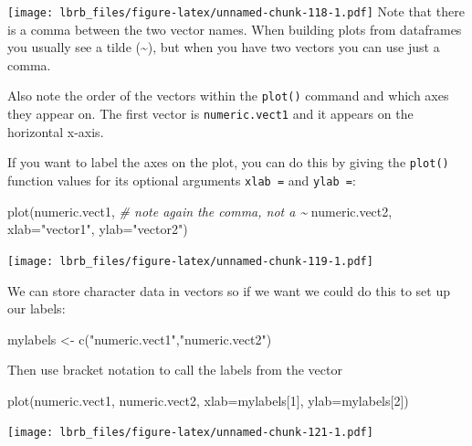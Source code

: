 \documentclass[
]{book}
\newenvironment{Shaded}{\begin{snugshade}}{\end{snugshade}}
\newcommand{\AttributeTok}[1]{\textcolor[rgb]{0.77,0.63,0.00}{#1}}
\newcommand{\CommentTok}[1]{\textcolor[rgb]{0.56,0.35,0.01}{\textit{#1}}}
\newcommand{\DecValTok}[1]{\textcolor[rgb]{0.00,0.00,0.81}{#1}}
\newcommand{\FunctionTok}[1]{\textcolor[rgb]{0.00,0.00,0.00}{#1}}
\newcommand{\NormalTok}[1]{#1}
\newcommand{\OtherTok}[1]{\textcolor[rgb]{0.56,0.35,0.01}{#1}}
\newcommand{\StringTok}[1]{\textcolor[rgb]{0.31,0.60,0.02}{#1}}
\begin{document}
\texttt{[image: lbrb\_files/figure-latex/unnamed-chunk-118-1.pdf]}
Note that there is a comma between the two vector names. When building plots from dataframes you usually see a tilde (\textasciitilde), but when you have two vectors you can use just a comma.

Also note the order of the vectors within the \texttt{plot()} command and which axes they appear on. The first vector is \texttt{numeric.vect1} and it appears on the horizontal x-axis.

If you want to label the axes on the plot, you can do this by giving the \texttt{plot()} function values for its optional arguments \texttt{xlab\ =} and \texttt{ylab\ =}:

\begin{Shaded}
\begin{Highlighting}[]
\FunctionTok{plot}\NormalTok{(numeric.vect1,   }\CommentTok{\# note again the comma, not a \textasciitilde{}}
\NormalTok{     numeric.vect2, }
     \AttributeTok{xlab=}\StringTok{"vector1"}\NormalTok{, }
     \AttributeTok{ylab=}\StringTok{"vector2"}\NormalTok{)}
\end{Highlighting}
\end{Shaded}

\texttt{[image: lbrb\_files/figure-latex/unnamed-chunk-119-1.pdf]}

We can store character data in vectors so if we want we could do this to set up our labels:

\begin{Shaded}
\begin{Highlighting}[]
\NormalTok{mylabels }\OtherTok{\textless{}{-}}  \FunctionTok{c}\NormalTok{(}\StringTok{"numeric.vect1"}\NormalTok{,}\StringTok{"numeric.vect2"}\NormalTok{)}
\end{Highlighting}
\end{Shaded}

Then use bracket notation to call the labels from the vector

\begin{Shaded}
\begin{Highlighting}[]
\FunctionTok{plot}\NormalTok{(numeric.vect1, }
\NormalTok{     numeric.vect2, }
     \AttributeTok{xlab=}\NormalTok{mylabels[}\DecValTok{1}\NormalTok{],}
     \AttributeTok{ylab=}\NormalTok{mylabels[}\DecValTok{2}\NormalTok{])}
\end{Highlighting}
\end{Shaded}

\texttt{[image: lbrb\_files/figure-latex/unnamed-chunk-121-1.pdf]}
\end{document}
